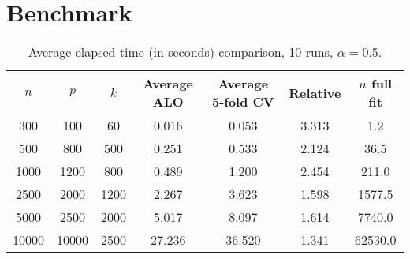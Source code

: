 \documentclass[11pt]{article}
\begin{document}
\section{Benchmark}
\begin{table}[H]
	\centering
	\begin{tabular}{ccc|cc|c|c}
		\hline\hline
		\(n\) & \(p\) & \(k\) & Average ALO & Average 5-fold CV & Relative & \(n\) full fit \\\hline
		300 & 100 & 60 & 0.016 & 0.053 & 3.313 & 1.2\\
		500 & 800 & 500 & 0.251 & 0.533 & 2.124 & 36.5\\
		1000 & 1200 & 800 & 0.489 & 1.200 & 2.454 & 211.0\\
		2500 & 2000 & 1200 & 2.267 & 3.623 & 1.598 & 1577.5\\
		5000 & 2500 & 2000 & 5.017 & 8.097 & 1.614 & 7740.0\\
		10000 & 10000 & 2500 & 27.236 & 36.520 & 1.341 & 62530.0\\\hline
	\end{tabular} 
	\caption{Average elapsed time (in seconds) comparison, 10 runs, \(\alpha=0.5\).}
\end{table}
\end{document}
